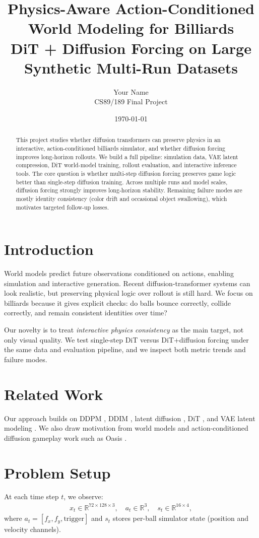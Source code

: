 \documentclass[11pt]{article}
\title{Physics-Aware Action-Conditioned World Modeling for Billiards\\
\large DiT + Diffusion Forcing on Large Synthetic Multi-Run Datasets}
\author{Your Name \\ CS89/189 Final Project}
\date{\today}
\begin{document}
\maketitle
\doublespacing

\begin{abstract}
This project studies whether diffusion transformers can preserve physics in an interactive, action-conditioned billiards simulator, and whether diffusion forcing improves long-horizon rollouts. We build a full pipeline: simulation data, VAE latent compression, DiT world-model training, rollout evaluation, and interactive inference tools. The core question is whether multi-step diffusion forcing preserves game logic better than single-step diffusion training. Across multiple runs and model scales, diffusion forcing strongly improves long-horizon stability. Remaining failure modes are mostly identity consistency (color drift and occasional object swallowing), which motivates targeted follow-up losses.
\end{abstract}

\section{Introduction}
World models predict future observations conditioned on actions, enabling simulation and interactive generation. Recent diffusion-transformer systems can look realistic, but preserving physical logic over rollout is still hard. We focus on billiards because it gives explicit checks: do balls bounce correctly, collide correctly, and remain consistent identities over time?

Our novelty is to treat \textit{interactive physics consistency} as the main target, not only visual quality. We test single-step DiT versus DiT+diffusion forcing under the same data and evaluation pipeline, and we inspect both metric trends and failure modes.

\section{Related Work}
Our approach builds on DDPM \cite{ho2020ddpm}, DDIM \cite{song2021ddim}, latent diffusion \cite{rombach2022ldm}, DiT \cite{peebles2023dit}, and VAE latent modeling \cite{kingma2014vae}. We also draw motivation from world models \cite{ha2018worldmodels, hafner2023dreamerv3} and action-conditioned diffusion gameplay work such as Oasis \cite{oasisrepo, oasisblog}.

\section{Problem Setup}
At each time step $t$, we observe:
\begin{align}
x_t \in \mathbb{R}^{72\times 128\times 3},\quad
a_t \in \mathbb{R}^{3},\quad
s_t \in \mathbb{R}^{16\times 4},
\end{align}
where $a_t=[f_x,f_y,\text{trigger}]$ and $s_t$ stores per-ball simulator state (position and velocity channels).
\end{document}
